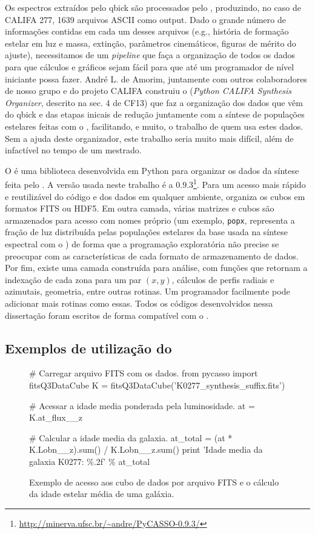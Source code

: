 Os espectros extraídos pelo {\sc qbick} são processados pelo \starlight, produzindo, no caso de CALIFA 277, 1639
arquivos ASCII como output. Dado o grande número de informações contidas em cada um desses arquivos (e.g., história de
formação estelar em luz e massa, extinção, parâmetros cinemáticos, figuras de mérito do ajuste), necessitamos de um
{\em pipeline} que faça a organização de todos os dados para que cálculos e gráficos sejam fácil para que até um programador
de nível iniciante possa fazer. André L. de Amorim, juntamente com outros colaboradores de nosso grupo e do projeto
CALIFA construiu o \pycasso ({\em Python CALIFA \starlight Synthesis Organizer}, descrito na sec. 4 de CF13) que faz a
organização dos dados que vêm do {\sc qbick} e das etapas inicais de redução juntamente com a síntese de populações
estelares feitas com o \starlight, facilitando, e muito, o trabalho de quem usa estes dados. Sem a ajuda deste
organizador, este trabalho seria muito mais difícil, além de infactível no tempo de um mestrado.

O \pycasso é uma biblioteca desenvolvida em Python para organizar os dados da síntese feita pelo \starlight. A versão
usada neste trabalho é a $0.9.3$\footnote{\url{http://minerva.ufsc.br/~andre/PyCASSO-0.9.3/}}. Para um acesso mais
rápido e reutilizável do código e dos dados em qualquer ambiente, organiza os cubos em formatos FITS ou HDF5. Em outra
camada, várias matrizes e cubos são armazenados para acesso com nomes próprio (um exemplo, \texttt{popx}, representa a
fração de luz distribuída pelas populações estelares da base usada na síntese espectral com o \starlight) de forma que a
programação exploratória não precise se preocupar com as características de cada formato de armazenamento de dados. Por
fim, existe uma camada construída para análise, com funções que retornam a indexação de cada zona para um par $(x, y)$,
cálculos de perfis radiais e azimutais, geometria, entre outras rotinas. Um programador facilmente pode adicionar mais
rotinas como essas. Todos os códigos desenvolvidos nessa dissertação foram escritos de forma compatível com o \pycasso.

\subsection{Exemplos de utilização do \pycasso}

\begin{figure}
	\begin{python}
# Carregar arquivo FITS com os dados.
from pycasso import fitsQ3DataCube
K = fitsQ3DataCube('K0277_synthesis_suffix.fits')

# Acessar a idade media ponderada pela luminosidade.
at = K.at_flux__z

# Calcular a idade media da galaxia.
at_total = (at * K.Lobn__z).sum() / K.Lobn__z.sum()
print 'Idade media da galaxia K0277: \%.2f' \% at_total
	\end{python}
	\caption[Exemplo de programa utilizando \pycasso.]
	{Exemplo de acesso aos cubo de dados por arquivo FITS e o cálculo da idade estelar média de uma galáxia.}
	\label{fig:dataAccess}
\end{figure}

